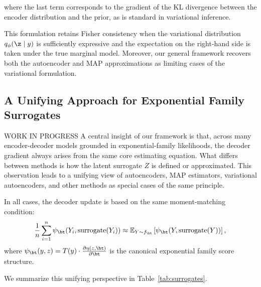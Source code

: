 where the last term corresponds to the gradient of the KL divergence between the encoder distribution and the prior, as is standard in variational inference.

This formulation retains Fisher consistency when the variational distribution \( q_\phi(\z \mid y) \) is sufficiently expressive and the expectation on the right-hand side is taken under the true marginal model. Moreover, our general framework recovers both the autoencoder and MAP approximations as limiting cases of the variational formulation.

\subsection{A Unifying Approach for Exponential Family Surrogates}
{\color{red} WORK IN PROGRESS}
A central insight of our framework is that, across many encoder-decoder models grounded in exponential-family likelihoods, the decoder gradient always arises from the same core estimating equation. What differs between methods is how the latent surrogate \( Z \) is defined or approximated. This observation leads to a unifying view of autoencoders, MAP estimators, variational autoencoders, and other methods as special cases of the same principle.

In all cases, the decoder update is based on the same moment-matching condition:
\[
\frac{1}{n} \sum_{i=1}^n \psi_\bt(Y_i, \text{surrogate}(Y_i)) \approx \mathbb{E}_{Y \sim f_\bt} \left[ \psi_\bt(Y, \text{surrogate}(Y)) \right],
\]
where \( \psi_\bt(y, z) = T(y) \cdot \frac{\partial \eta(z, \bt)}{\partial \bt} \) is the canonical exponential family score structure.

We summarize this unifying perspective in Table~\ref{tab:surrogates}.


